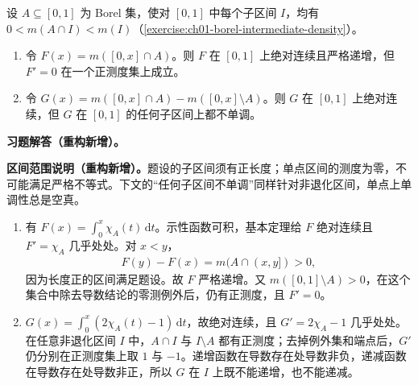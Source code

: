 \documentclass[../../main.tex]{subfiles}%
\begin{document}
\begin{exercise}\label{exercise:ch03-ac-strict-nonmonotone}
设 $A\subseteq[0,1]$ 为 Borel 集，使对 $[0,1]$ 中每个子区间 $I$，均有 $0<m(A\cap I)<m(I)$（\cref{exercise:ch01-borel-intermediate-density}）。
\begin{enumerate}
\item\label{item:ch03-ac-strict-zero-derivative} 令 $F(x)=m([0,x]\cap A)$。则 $F$ 在 $[0,1]$ 上绝对连续且严格递增，但 $F'=0$ 在一个正测度集上成立。
\item\label{item:ch03-ac-nowhere-monotone} 令 $G(x)=m([0,x]\cap A)-m([0,x]\setminus A)$。则 $G$ 在 $[0,1]$ 上绝对连续，但 $G$ 在 $[0,1]$ 的任何子区间上都不单调。
\end{enumerate}
\end{exercise}
\begin{solution}
\label{solution:ch03-ac-strict-nonmonotone}
\textbf{习题解答（重构新增）。}\begin{remark}
\textbf{区间范围说明（重构新增）。}题设的子区间须有正长度；单点区间的测度为零，不可能满足严格不等式。下文的“任何子区间不单调”同样针对非退化区间，单点上单调性总是空真。
\end{remark}
\begin{enumerate}
\item 有 $F(x)=\int_0^x\chi_A(t)\,\mathrm dt$。示性函数可积，基本定理给 $F$ 绝对连续且 $F'=\chi_A$ 几乎处处。对 $x<y$，
\begin{align*}
F(y)-F(x)=m(A\cap(x,y])>0,
\end{align*}
因为长度正的区间满足题设。故 $F$ 严格递增。又 $m([0,1]\setminus A)>0$，在这个集合中除去导数结论的零测例外后，仍有正测度，且 $F'=0$。
\item $G(x)=\int_0^x(2\chi_A(t)-1)\,\mathrm dt$，故绝对连续，且 $G'=2\chi_A-1$ 几乎处处。在任意非退化区间 $I$ 中，$A\cap I$ 与 $I\setminus A$ 都有正测度；去掉例外集和端点后，$G'$ 仍分别在正测度集上取 $1$ 与 $-1$。递增函数在导数存在处导数非负，递减函数在导数存在处导数非正，所以 $G$ 在 $I$ 上既不能递增，也不能递减。
\end{enumerate}
\end{solution}
\end{document}

